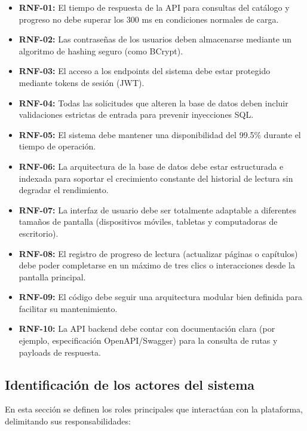 \documentclass[12pt, atypical, journal]{article}
\begin{document}
\begin{itemize}
	\item \textbf{RNF-01:} El tiempo de respuesta de la API para consultas del catálogo y progreso no debe superar los 300 ms en condiciones normales de carga.
	\item \textbf{RNF-02:} Las contraseñas de los usuarios deben almacenarse mediante un algoritmo de hashing seguro (como BCrypt).
	\item \textbf{RNF-03:} El acceso a los endpoints del sistema debe estar protegido mediante tokens de sesión (JWT).
	\item \textbf{RNF-04:} Todas las solicitudes que alteren la base de datos deben incluir validaciones estrictas de entrada para prevenir inyecciones SQL.
	\item \textbf{RNF-05:} El sistema debe mantener una disponibilidad del 99.5\% durante el tiempo de operación.
	\item \textbf{RNF-06:} La arquitectura de la base de datos debe estar estructurada e indexada para soportar el crecimiento constante del historial de lectura sin degradar el rendimiento.
	\item \textbf{RNF-07:} La interfaz de usuario debe ser totalmente adaptable a diferentes tamaños de pantalla (dispositivos móviles, tabletas y computadoras de escritorio).
	\item \textbf{RNF-08:} El registro de progreso de lectura (actualizar páginas o capítulos) debe poder completarse en un máximo de tres clics o interacciones desde la pantalla principal.
	\item \textbf{RNF-09:} El código debe seguir una arquitectura modular bien definida para facilitar su mantenimiento.
	\item \textbf{RNF-10:} La API backend debe contar con documentación clara (por ejemplo, especificación OpenAPI/Swagger) para la consulta de rutas y payloads de respuesta.
\end{itemize}

\subsection{Identificación de los actores del sistema}
En esta sección se definen los roles principales que interactúan con la plataforma, delimitando sus responsabilidades:
\end{document}
